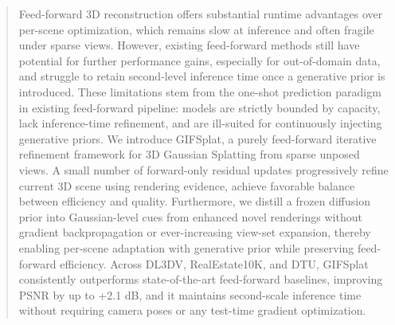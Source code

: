 \begin{abstract}
Feed-forward 3D reconstruction offers substantial runtime advantages over per-scene optimization, which remains slow at inference and often fragile under sparse views. However, existing feed-forward methods still have potential for further performance gains, especially for out-of-domain data, and struggle to retain second-level inference time once a generative prior is introduced. These limitations stem from the one-shot prediction paradigm in existing feed-forward pipeline: models are strictly bounded by capacity, lack inference-time refinement, and are ill-suited for continuously injecting generative priors. We introduce GIFSplat, a purely feed-forward iterative refinement framework for 3D Gaussian Splatting from sparse unposed views. A small number of forward-only residual updates progressively refine current 3D scene using rendering evidence, achieve favorable balance between efficiency and quality.  Furthermore, we distill a frozen diffusion prior into Gaussian-level cues from enhanced novel renderings without gradient backpropagation or ever-increasing view-set expansion, thereby enabling per-scene adaptation with generative prior while preserving feed-forward efficiency. Across DL3DV, RealEstate10K, and DTU, GIFSplat consistently outperforms state-of-the-art feed-forward baselines, improving PSNR by up to +2.1 dB, and it maintains second-scale inference time without requiring camera poses or any test-time gradient optimization.
\end{abstract}





